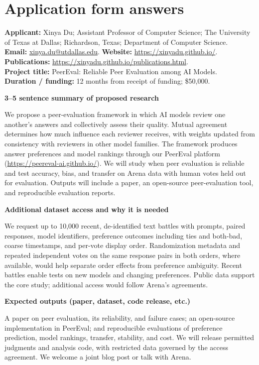 \documentclass[12pt,letterpaper]{article}
\newcommand{\formq}[1]{\par\addvspace{5pt}\noindent\textbf{#1}\par\nopagebreak\noindent\ignorespaces}
\begin{document}
\section*{Application form answers}
\noindent\textbf{Applicant:} Xinya Du; Assistant Professor of Computer Science; The University of Texas at Dallas; Richardson, Texas; Department of Computer Science.\\
\textbf{Email:} \href{mailto:xinya.du@utdallas.edu}{xinya.du@utdallas.edu}. \textbf{Website:} \url{https://xinyadu.github.io/}.\\
\textbf{Publications:} \url{https://xinyadu.github.io/publications.html}.\\
\textbf{Project title:} PeerEval: Reliable Peer Evaluation among AI Models.\\
\textbf{Duration / funding:} 12 months from receipt of funding; \$50,000.

\formq{3--5 sentence summary of proposed research}
We propose a peer-evaluation framework in which AI models review one another's answers and collectively assess their quality. Mutual agreement determines how much influence each reviewer receives, with weights updated from consistency with reviewers in other model families. The framework produces answer preferences and model rankings through our PeerEval platform (\url{https://peereval-ai.github.io/}). We will study when peer evaluation is reliable and test accuracy, bias, and transfer on Arena data with human votes held out for evaluation. Outputs will include a paper, an open-source peer-evaluation tool, and reproducible evaluation reports.

\formq{Additional dataset access and why it is needed}
We request up to 10,000 recent, de-identified text battles with prompts, paired responses, model identifiers, preference outcomes including ties and both-bad, coarse timestamps, and per-vote display order. Randomization metadata and repeated independent votes on the same response pairs in both orders, where available, would help separate order effects from preference ambiguity. Recent battles enable tests on new models and changing preferences. Public data support the core study; additional access would follow Arena's agreements.

\formq{Expected outputs (paper, dataset, code release, etc.)}
A paper on peer evaluation, its reliability, and failure cases; an open-source implementation in PeerEval; and reproducible evaluations of preference prediction, model rankings, transfer, stability, and cost. We will release permitted judgments and analysis code, with restricted data governed by the access agreement. We welcome a joint blog post or talk with Arena.
\end{document}
